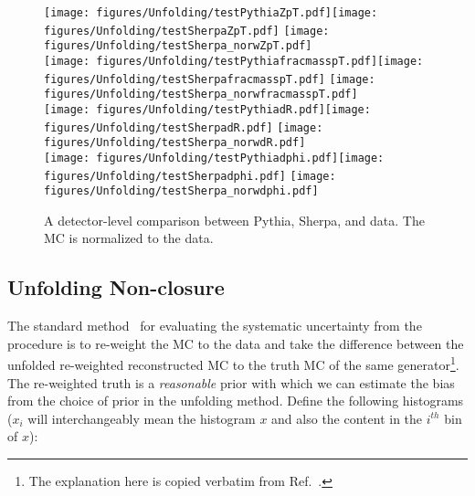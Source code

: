 \begin{figure}[htpb!]
\begin{center}
\texttt{[image: figures/Unfolding/testPythiaZpT.pdf]}\texttt{[image: figures/Unfolding/testSherpaZpT.pdf]}
\texttt{[image: figures/Unfolding/testSherpa\_norwZpT.pdf]}\\

\texttt{[image: figures/Unfolding/testPythiafracmasspT.pdf]}\texttt{[image: figures/Unfolding/testSherpafracmasspT.pdf]}
\texttt{[image: figures/Unfolding/testSherpa\_norwfracmasspT.pdf]}\\

\texttt{[image: figures/Unfolding/testPythiadR.pdf]}\texttt{[image: figures/Unfolding/testSherpadR.pdf]}
\texttt{[image: figures/Unfolding/testSherpa\_norwdR.pdf]}\\

\texttt{[image: figures/Unfolding/testPythiadphi.pdf]}\texttt{[image: figures/Unfolding/testSherpadphi.pdf]}
\texttt{[image: figures/Unfolding/testSherpa\_norwdphi.pdf]}

\caption[]{A detector-level comparison between Pythia, Sherpa, and data.  The MC is normalized to the data.} 
\label{fig:frag2}
\end{center}
\end{figure}

\subsection{Unfolding Non-closure}
\label{sec:systs:unfolding}

The standard method~\cite{Armbruster:1694351,unfolding} for evaluating the systematic uncertainty from the procedure is to re-weight the MC to the data and take the difference between the unfolded re-weighted reconstructed MC to the truth MC of the same generator\footnote{The explanation here is copied verbatim from Ref.~\cite{1693534}.}.  The re-weighted truth is a \textit{reasonable} prior with which we can estimate the bias from the choice of prior in the unfolding method.   Define the following histograms ($x_i$ will interchangeably mean the histogram $x$ and also the content in the $i^{th}$ bin of $x$):

